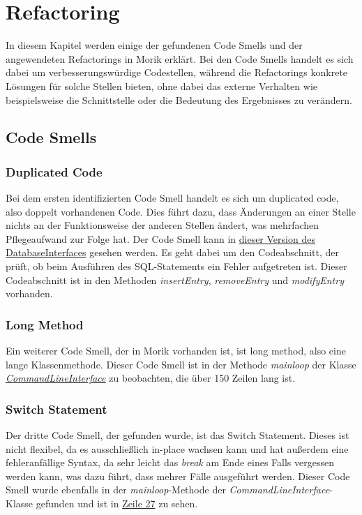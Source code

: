 \chapter{Refactoring}
In diesem Kapitel werden einige der gefundenen Code Smells und der angewendeten Refactorings in Morik erklärt. Bei den Code Smells handelt es sich dabei um verbesserungswürdige Codestellen, während die Refactorings konkrete Lösungen für solche Stellen bieten, ohne dabei das externe Verhalten wie beispielsweise die Schnittstelle oder die Bedeutung des Ergebnisses zu verändern.

\section{Code Smells}
\subsection{Duplicated Code}
Bei dem ersten identifizierten Code Smell handelt es sich um duplicated code, also doppelt vorhandenen Code. Dies führt dazu, dass Änderungen an einer Stelle nichts an der Funktionsweise der anderen Stellen ändert, was mehrfachen Pflegeaufwand zur Folge hat. Der Code Smell kann in \href{https://github.com/moorts/Morik/blob/8c90c65347f25b5a5a26f68c66189984dfb0bca6/src/adapters/database/DatabaseInterface.cpp}{dieser Version des DatabaseInterfaces} gesehen werden. Es geht dabei um den Codeabschnitt, der prüft, ob beim Ausführen des SQL-Statements ein Fehler aufgetreten ist. Dieser Codeabschnitt ist in den Methoden \textit{insertEntry}, \textit{removeEntry} und \textit{modifyEntry} vorhanden.

\subsection{Long Method}
Ein weiterer Code Smell, der in Morik vorhanden ist, ist long method, also eine lange Klassenmethode. Dieser Code Smell ist in der Methode \textit{mainloop} der Klasse \href{https://github.com/moorts/Morik/blob/main/src/plugins/ui/CommandLineInterface.cpp}{\textit{CommandLineInterface}} zu beobachten, die über 150 Zeilen lang ist.

\subsection{Switch Statement}
Der dritte Code Smell, der gefunden wurde, ist das Switch Statement. Dieses ist nicht flexibel, da es ausschließlich in-place wachsen kann und hat außerdem eine fehleranfällige Syntax, da sehr leicht das \textit{break} am Ende eines Falls vergessen werden kann, was dazu führt, dass mehrer Fälle ausgeführt werden. Dieser Code Smell wurde ebenfalls in der \textit{mainloop}-Methode der \textit{CommandLineInterface}-Klasse gefunden und ist in \href{https://github.com/moorts/Morik/blob/5fad45957d77585d88bf3330cab6004315e6e2e3/src/plugins/ui/CommandLineInterface.cpp#L27}{Zeile 27} zu sehen.

